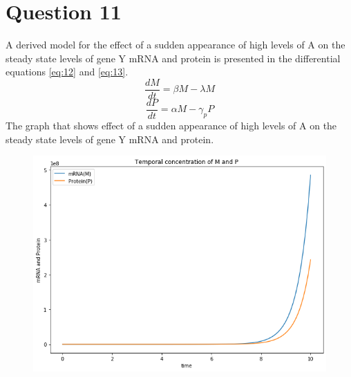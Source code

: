 \documentclass[12pt,a4paper]{article}
\begin{document}
\section*{Question 11}
A derived model for the effect
of a sudden appearance of high levels of A on the steady state levels of gene Y mRNA and
protein is presented in the differential equations \eqref{eq:12}  and \eqref{eq:13}.
\begin{equation}
\frac{dM}{dt} =  \beta M -   \lambda M 
\label{eq:12}
\end{equation}
\begin{equation}
\frac{dP}{dt} =  \alpha M -   \gamma_p P 
\label{eq:13}
\end{equation}
The graph that shows effect
of a sudden appearance of high levels of A on the steady state levels of gene Y mRNA and
protein.
\begin{figure}[H]
\centering
\includegraphics[scale=0.5]{./gaphics/q_11.png}
\caption{ }
\end{figure}
\end{document}
